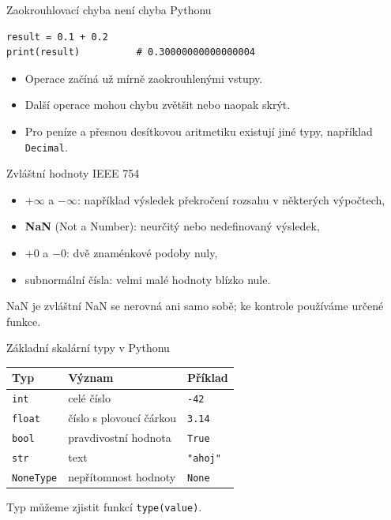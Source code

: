 \documentclass[aspectratio=169]{beamer}
\newcommand{\term}[1]{\textcolor{CodeBlue}{\textbf{#1}}}
\begin{document}
\begin{frame}[fragile]{Zaokrouhlovací chyba není chyba Pythonu}
\begin{lstlisting}[style=python]
result = 0.1 + 0.2
print(result)          # 0.30000000000000004
\end{lstlisting}
  \begin{itemize}
    \item Operace začíná už mírně zaokrouhlenými vstupy.
    \item Další operace mohou chybu zvětšit nebo naopak skrýt.
    \item Pro peníze a přesnou desítkovou aritmetiku existují jiné typy, například \texttt{Decimal}.
  \end{itemize}
\end{frame}

\begin{frame}{Zvláštní hodnoty IEEE 754}
  \begin{itemize}
    \item $+\infty$ a $-\infty$: například výsledek překročení rozsahu v některých výpočtech,
    \item \term{NaN} (Not a Number): neurčitý nebo nedefinovaný výsledek,
    \item $+0$ a $-0$: dvě znaménkové podoby nuly,
    \item subnormální čísla: velmi malé hodnoty blízko nule.
  \end{itemize}
  \begin{alertblock}{NaN je zvláštní}
    NaN se nerovná ani samo sobě; ke kontrole používáme určené funkce.
  \end{alertblock}
\end{frame}

\begin{frame}{Základní skalární typy v Pythonu}
  \centering
  \begin{tabular}{lll}
    \textbf{Typ} & \textbf{Význam} & \textbf{Příklad} \\
    \hline
    \texttt{int} & celé číslo & \texttt{-42} \\
    \texttt{float} & číslo s plovoucí čárkou & \texttt{3.14} \\
    \texttt{bool} & pravdivostní hodnota & \texttt{True} \\
    \texttt{str} & text & \texttt{"ahoj"} \\
    \texttt{NoneType} & nepřítomnost hodnoty & \texttt{None} \\
  \end{tabular}
  \vspace{5mm}

  Typ můžeme zjistit funkcí \texttt{type(value)}.
\end{frame}
\end{document}

